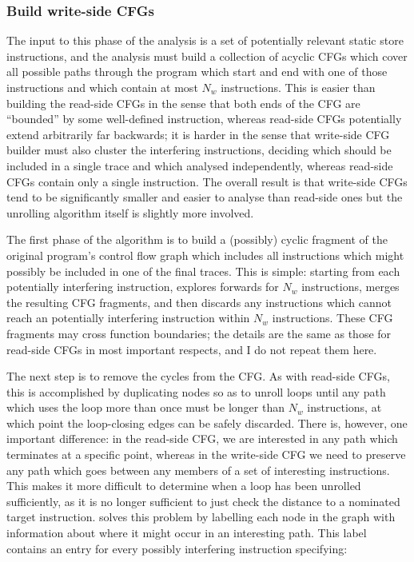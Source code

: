 \subsubsection{Build write-side CFGs}

The input to this phase of the analysis is a set of potentially
relevant static store instructions, and the analysis must build a
collection of acyclic CFGs which cover all possible paths through the
program which start and end with one of those instructions and which
contain at most $N_w$ instructions.  This is easier than building the
read-side CFGs in the sense that both ends of the CFG are ``bounded''
by some well-defined instruction, whereas read-side CFGs potentially
extend arbitrarily far backwards; it is harder in the sense that
write-side CFG builder must also cluster the interfering instructions,
deciding which should be included in a single trace and which analysed
independently, whereas read-side CFGs contain only a single
instruction.  The overall result is that write-side CFGs tend to be
significantly smaller and easier to analyse than read-side ones but
the unrolling algorithm itself is slightly more involved.

The first phase of the algorithm is to build a (possibly) cyclic
fragment of the original program's control flow graph which includes
all instructions which might possibly be included in one of the final
traces.  This is simple: starting from each potentially interfering
instruction, {\technique} explores forwards for $N_w$ instructions,
merges the resulting CFG fragments, and then discards any instructions
which cannot reach an potentially interfering instruction within $N_w$
instructions.  These CFG fragments may cross function boundaries; the
details are the same as those for read-side CFGs in most important
respects, and I do not repeat them here.

The next step is to remove the cycles from the CFG.  As with read-side
CFGs, this is accomplished by duplicating nodes so as to unroll loops
until any path which uses the loop more than once must be longer than
$N_w$ instructions, at which point the loop-closing edges can be
safely discarded.  There is, however, one important difference: in the
read-side CFG, we are interested in any path which terminates at a
specific point, whereas in the write-side CFG we need to preserve any
path which goes between any members of a set of interesting
instructions.  This makes it more difficult to determine when a loop
has been unrolled sufficiently, as it is no longer sufficient to just
check the distance to a nominated target instruction.  {\Technique}
solves this problem by labelling each node in the graph with
information about where it might occur in an interesting path.  This
label contains an entry for every possibly interfering instruction
specifying:

